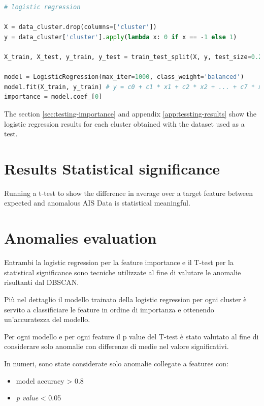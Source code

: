 \begin{lstlisting}[language=Python]
# logistic regression

X = data_cluster.drop(columns=['cluster'])
y = data_cluster['cluster'].apply(lambda x: 0 if x == -1 else 1)

X_train, X_test, y_train, y_test = train_test_split(X, y, test_size=0.2, stratify=y, random_state=42)

model = LogisticRegression(max_iter=1000, class_weight='balanced')
model.fit(X_train, y_train) # y = c0 + c1 * x1 + c2 * x2 + ... + c7 * x7
importance = model.coef_[0]
\end{lstlisting}

The section \ref{sec:testing-importance} and appendix \ref{app:tessting-results} show the logistic regression results for each cluster obtained with the dataset used as a test.


\section{Results Statistical significance}
\label{sec:significance}

Running a t-test to show the difference in average over a target feature between expected and anomalous AIS Data is statistical meaningful.


\section{Anomalies evaluation}
Entrambi la logistic regression per la feature importance e il T-test per la statistical significance sono tecniche utilizzate al fine di valutare le anomalie risultanti dal DBSCAN.

Più nel dettaglio il modello trainato della logistic regression per ogni cluster è servito a classificiare le feature in ordine di importanza e ottenendo un'accuratezza del modello.

Per ogni modello e per ogni feature il p value del T-test è stato valutato al fine di considerare solo anomalie con differenze di medie nel valore significativi.

In numeri, sono state considerate solo anomalie collegate a features con:
\begin{itemize}
\item model accuracy > 0.8
\item \textit{p value} < 0.05
\end{itemize}
